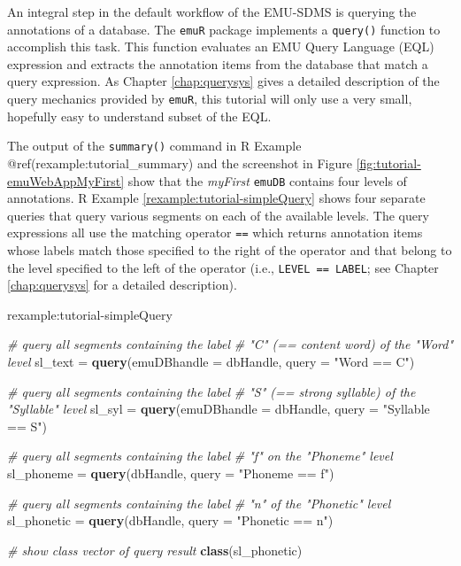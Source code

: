 \documentclass[]{book}
\newenvironment{Shaded}{\begin{snugshade}}{\end{snugshade}}
\newcommand{\CommentTok}[1]{\textcolor[rgb]{0.56,0.35,0.01}{\textit{#1}}}
\newcommand{\DataTypeTok}[1]{\textcolor[rgb]{0.13,0.29,0.53}{#1}}
\newcommand{\KeywordTok}[1]{\textcolor[rgb]{0.13,0.29,0.53}{\textbf{#1}}}
\newcommand{\NormalTok}[1]{#1}
\newcommand{\StringTok}[1]{\textcolor[rgb]{0.31,0.60,0.02}{#1}}
\theoremstyle{definition}
\theoremstyle{definition}
\theoremstyle{definition}
\theoremstyle{remark}
\begin{document}
An integral step in the default workflow of the EMU-SDMS is querying the
annotations of a database. The \texttt{emuR} package implements a
\texttt{query()} function to accomplish this task. This function
evaluates an EMU Query Language (EQL) expression and extracts the
annotation items from the database that match a query expression. As
Chapter \ref{chap:querysys} gives a detailed description of the query
mechanics provided by \texttt{emuR}, this tutorial will only use a very
small, hopefully easy to understand subset of the EQL.

The output of the \texttt{summary()} command in R Example
@ref(rexample:tutorial\_summary) and the screenshot in Figure
\ref{fig:tutorial-emuWebAppMyFirst} show that the \emph{myFirst}
\texttt{emuDB} contains four levels of annotations. R Example
\ref{rexample:tutorial-simpleQuery} shows four separate queries that
query various segments on each of the available levels. The query
expressions all use the matching operator \texttt{==} which returns
annotation items whose labels match those specified to the right of the
operator and that belong to the level specified to the left of the
operator (i.e., \texttt{LEVEL\ ==\ LABEL}; see Chapter
\ref{chap:querysys} for a detailed description).

rexample:tutorial-simpleQuery

\begin{Shaded}
\begin{Highlighting}[]
\CommentTok{# query all segments containing the label}
\CommentTok{# "C" (== content word) of the "Word" level}
\NormalTok{sl_text =}\StringTok{ }\KeywordTok{query}\NormalTok{(}\DataTypeTok{emuDBhandle =}\NormalTok{ dbHandle,}
                \DataTypeTok{query =} \StringTok{"Word == C"}\NormalTok{)}

\CommentTok{# query all segments containing the label}
\CommentTok{# "S" (== strong syllable) of the "Syllable" level}
\NormalTok{sl_syl =}\StringTok{ }\KeywordTok{query}\NormalTok{(}\DataTypeTok{emuDBhandle =}\NormalTok{ dbHandle,}
               \DataTypeTok{query =} \StringTok{"Syllable == S"}\NormalTok{)}

\CommentTok{# query all segments containing the label}
\CommentTok{# "f" on the "Phoneme" level}
\NormalTok{sl_phoneme =}\StringTok{ }\KeywordTok{query}\NormalTok{(dbHandle,}
                   \DataTypeTok{query =} \StringTok{"Phoneme == f"}\NormalTok{)}

\CommentTok{# query all segments containing the label}
\CommentTok{# "n" of the "Phonetic" level}
\NormalTok{sl_phonetic =}\StringTok{ }\KeywordTok{query}\NormalTok{(dbHandle,}
                    \DataTypeTok{query =} \StringTok{"Phonetic == n"}\NormalTok{)}

\CommentTok{# show class vector of query result}
\KeywordTok{class}\NormalTok{(sl_phonetic)}
\end{Highlighting}
\end{Shaded}
\end{document}
